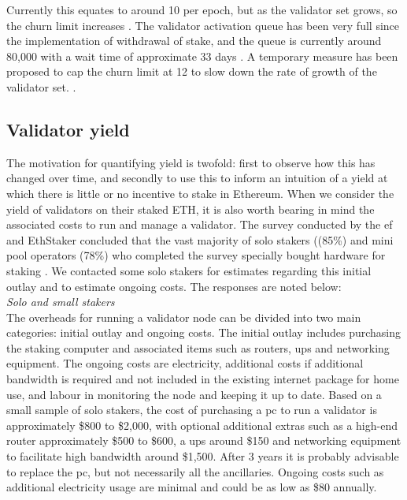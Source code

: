\documentclass[UTF8]{article}
\begin{document}
{Currently this equates to around 10 per epoch, but as the validator set grows, so the churn limit increases \cite{liquid2023}.
The validator activation queue has been very full since the implementation of withdrawal of stake, and the queue is currently around 80,000 with a wait time of approximate 33 days \cite{ea2023q}. 
A temporary measure has been proposed to cap the churn limit at 12 to slow down the rate of growth of the validator set. \cite{dapplion}.

\subsection{Validator yield}
\label{yield}
The motivation for quantifying yield is twofold: first to observe how this has changed over time, and secondly to use this to inform an intuition of a yield at which there is little or no incentive to stake in Ethereum.
When we consider the yield of validators on their staked ETH, it is also worth bearing in mind the associated costs to run and manage a validator. 
The survey conducted by the \gls{ef} and EthStaker concluded that the vast majority of solo stakers ((85\%) and mini pool operators (78\%) who completed the survey specially bought hardware for staking \cite{Smith2023}. We contacted some solo stakers for estimates regarding this initial outlay and to estimate ongoing costs. The responses are noted below: \\
\noindent
\textit{Solo and small stakers} \\
The overheads for running a validator node can be divided into two main categories: initial outlay and ongoing costs. The initial outlay includes purchasing the staking computer and associated  items such as routers, \gls{ups} and networking equipment. The ongoing costs are electricity, additional costs if additional bandwidth is required and not included in the existing internet package for home use, and labour in monitoring the node and keeping it up to date. Based on a small sample of solo stakers, the cost of purchasing a \gls{pc} to run a validator is approximately \$800 to \$2,000, with optional additional extras such as a high-end router approximately \$500 to \$600, a \gls{ups} around \$150 and networking equipment to facilitate high bandwidth around \$1,500. After 3 years it is probably advisable to replace the \gls{pc}, but not necessarily all the ancillaries. Ongoing costs such as additional electricity usage are minimal and could be as low as \$80 annually. 

}
\end{document}
